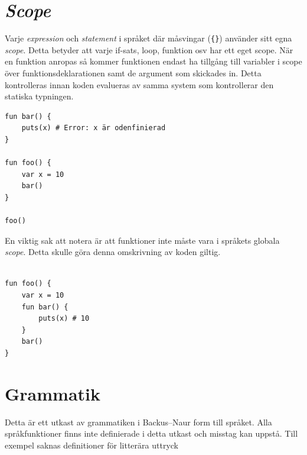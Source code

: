 \documentclass{TDP003mall}
\begin{document}
\section{\textit{Scope}}
Varje \textit{expression} och \textit{statement} i språket där måsvingar (\texttt{\{\}}) använder sitt egna \textit{scope}. Detta betyder att varje if-sats, loop, funktion osv har ett eget scope. När en funktion anropas så kommer funktionen endast ha tillgång till variabler i scope över funktionsdeklarationen samt de argument som skickades in. Detta kontrolleras innan koden evalueras av samma system som kontrollerar den statiska typningen.

\begin{verbatim}
fun bar() {
    puts(x) # Error: x är odenfinierad
}

fun foo() {
    var x = 10
    bar()
}

foo()
\end{verbatim}

En viktig sak att notera är att funktioner inte måste vara i språkets globala \textit{scope}. Detta skulle göra denna omskrivning av koden giltig.

\begin{verbatim}

fun foo() {
    var x = 10
    fun bar() {
        puts(x) # 10
    }
    bar()
}
\end{verbatim}

\section{Grammatik}
Detta är ett utkast av grammatiken i Backus–Naur form till språket. Alla språkfunktioner finns inte definierade i detta utkast och misstag kan uppstå. Till exempel saknas definitioner för litterära uttryck
\end{document}

